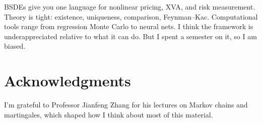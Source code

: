 \documentclass[11pt]{article}
\theoremstyle{definition}
\theoremstyle{remark}
\begin{document}
BSDEs give you one language for nonlinear pricing, XVA, and risk
measurement. Theory is tight: existence, uniqueness, comparison,
Feynman--Kac. Computational tools range from regression Monte Carlo to
neural nets. I think the framework is underappreciated relative to what
it can do. But I spent a semester on it, so I am biased.


\section*{Acknowledgments}

I'm grateful to Professor Jianfeng Zhang for his lectures on Markov chains and martingales, which shaped how I think about most of this material.



\end{document}
